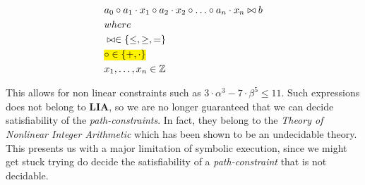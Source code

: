 	  
	 
	 \begin{align*}
	 	& a_0 \circ a_1 \cdot x_1 \circ a_2 \cdot x_2 \circ \ldots \circ a_n \cdot x_n \bowtie b \\
	 	& where \\
	 	& \bowtie \in  \{\leq, \geq, =\}\\
	 	& \text{\hl{$\circ \in  \{ +, \cdot \}$}}\\
	 	& x_1, \ldots, x_n \in \mathbb{Z}
	 \end{align*}
	
	This allows for non linear constraints such as $3 \cdot \alpha ^3 - 7\cdot \beta ^ 5 \leq 11$. Such expressions does not belong to \textbf{LIA}, so we are no longer guaranteed that we can decide satisfiability of the \emph{path-constraints}. In fact, they belong to the \emph{Theory of Nonlinear Integer Arithmetic} which has been shown to be an undecidable theory. %
	This presents us with a major limitation of symbolic execution, since we might get stuck trying do decide the satisfiability of a \emph{path-constraint} that is not decidable.	